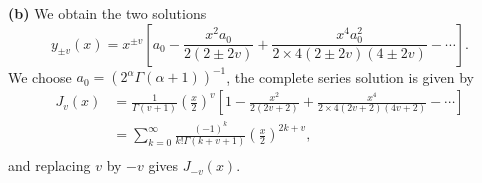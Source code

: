 \documentclass[12pt]{article}
\begin{document}
\smallbreak
\smallbreak
\noindent\textbf{(b)} \quad We obtain the two solutions
\begin{equation}
    y_{\pm v}(x) = x^{\pm v} \left[a_0 - \frac{x^2 a_0}{2(2 \pm 2v)}  + \frac{x^4a_0^2}{2 \times 4(2 \pm 2v)(4 \pm 2v)} - \cdots \right].
\end{equation}
We choose $a_0 = (2^{\alpha} \Gamma(\alpha + 1))^{-1}$, the complete series solution is given by
\begin{equation}
\begin{aligned}
    J_{v}(x) &= \frac{1}{\Gamma(v+1)} \left(\frac{x}{2}\right)^v \left[1 - \frac{x^2}{2(2v+2)} + \frac{x^4}{2 \times 4(2v+2)(4v+2)} - \cdots \right]\\
    &= \sum_{k=0}^{\infty} \frac{(-1)^k}{k! \Gamma(k+v+1)} \left(\frac{x}{2}\right)^{2k+v},\\
    \label{eq:Bessel}
\end{aligned}
\end{equation}
and replacing $v$ by $-v$ gives $J_{-v}(x)$.
\end{document}
